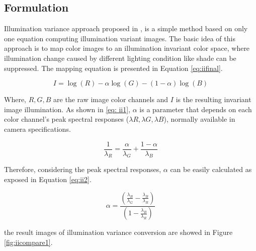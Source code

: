 \subsection{Formulation}
Illumination variance approach proposed in \cite{maddern2014illumination}, is a simple method based on only one equation computing illumination variant images. The basic idea of this approach is to map color images to an illumination invariant color space, where illumination change caused by different lighting condition like shade can be suppressed. The mapping equation
is presented in Equation \ref{eq:iifinal}.

\begin{equation}
I=\log(R)-\alpha\log(G)-(1-\alpha)\log(B)
\label{eq:iifinal}
\end{equation}

Where, $R, G, B$ are the raw image color channels and $I$ is the resulting invariant image illumination. As shown in \ref{eq: ii1}, $\alpha$ is a parameter that depends on each color channel's peak spectral responses ($ \lambda R, \lambda G, \lambda B$), normally available in camera specifications. 

\begin{equation}
\frac{1}{\lambda_R}=\frac{\alpha}{\lambda_G}+\frac{1-\alpha}{\lambda_B}
\label{eq:ii1}
\end{equation}

Therefore, considering the peak spectral responses, $\alpha$ can be easily calculated as exposed in Equation \ref{eq:ii2}.

\begin{equation}
\alpha=\frac{(\frac{\lambda_B}{\lambda_G}-\frac{\lambda_B}{\lambda_R})}{(1-\frac{\lambda_B}{\lambda_R})}
\label{eq:ii2}
\end{equation}

the result images of illumination variance conversion are showed in Figure \ref{fig:iicompare1}.

